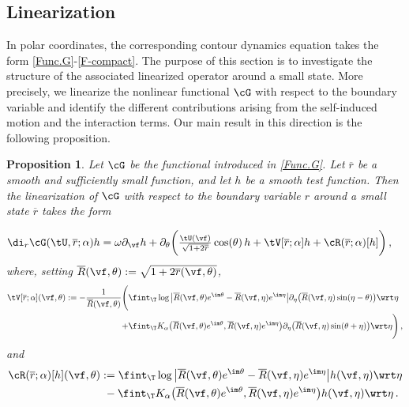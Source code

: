 \documentclass[a4paper,reqno,10pt]{article}
\newtheorem{pro}{Proposition}[section]
\newcommand{\pa}{\partial}
\begin{document}
\subsection{Linearization}

 In polar coordinates, the corresponding contour dynamics equation takes the form \eqref{Func.G}-\eqref{F-compact}. The purpose of this section is to investigate the structure of the associated linearized operator around a small state.
More precisely, we linearize the nonlinear functional $\cG$ with respect to the boundary variable and identify the different contributions arising from the self-induced motion and the interaction terms. 
Our main result in this direction is the following proposition.


 \begin{pro}\label{linea-prop}
     Let $\cG$ be the functional introduced in \eqref{Func.G}. 
Let $\overline r$ be a smooth and sufficiently small function, and let $h$ be a smooth test function. Then the linearization of $\cG$ with respect to the boundary variable $r$ around a small  state $\overline r$ takes the form

     \begin{align}\label{nonlinear.cG}
\di_{r}\cG(\tU,\overline{r};\alpha)h= \omega \pa_{\vf} h &+ \pa_{\theta} \bigg(  \tfrac{\tU(\vf)}{\sqrt{1+2 \overline{r}}} \cos(\theta)\, h +\tV[\overline r;\alpha] h + \cR(\overline r;\alpha)[h] \bigg)\,, 
         \end{align}
         where, setting $\overline R (\vf,\theta):=\sqrt{1+2\overline r(\vf,\theta)}$,
         \begin{align}\label{V.at.boundary}
			\nonumber \tV[\overline r;\alpha](\vf,\theta) :=  - \frac{1}{ \overline R(\vf,\theta) }\Bigg( &\fint_{\T} \log\big|\overline R(\vf,\theta) e^{\im\theta}- \overline R(\vf,\eta)e^{\im\eta} \big| \pa_{\eta} \big( \overline R(\vf,\eta) \sin(\eta-\theta) \big) \wrt\eta \\
			+ & \fint_{\T} K_\alpha\big(\overline R(\vf,\theta)e^{\im\theta}, \overline R(\vf,\eta)e^{\im\eta} \big) \pa_{\eta} \big( \overline R(\vf,\eta) \sin(\theta+\eta) \big) \wrt \eta \Bigg)\,,
		\end{align}
  and 
\begin{align}\label{cR.lin.app}
	\nonumber 	\cR(\overline{r};\alpha)[h](\vf,\theta)& :=  \fint_{\T} \log \big| \overline R(\vf,\theta)e^{\im\theta} - \overline R(\vf,\eta)e^{\im\eta} \big| h(\vf,\eta) \wrt \eta \\
	&\  - \fint_{\T} K_{\alpha}\big( \overline R(\vf,\theta)e^{\im\theta}, \overline R(\vf,\eta)e^{\im\eta} \big) h(\vf,\eta) \wrt \eta\,.
\end{align}
 \end{pro} 
\end{document}
